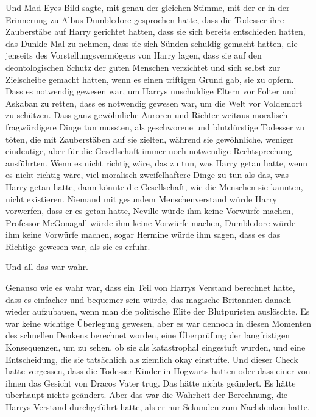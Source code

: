 Und Mad-Eyes Bild sagte, mit genau der gleichen Stimme, mit der er in der Erinnerung zu Albus Dumbledore gesprochen hatte, dass die Todesser ihre Zauberstäbe auf Harry gerichtet hatten, dass sie sich bereits entschieden hatten, das Dunkle Mal zu nehmen, dass sie sich Sünden schuldig gemacht hatten, die jenseits des Vorstellungsvermögens von Harry lagen, dass sie auf den deontologischen Schutz der guten Menschen verzichtet und sich selbst zur Zielscheibe gemacht hatten, wenn es einen triftigen Grund gab, sie zu opfern. Dass es notwendig gewesen war, um Harrys unschuldige Eltern vor Folter und Askaban zu retten, dass es notwendig gewesen war, um die Welt vor Voldemort zu schützen. Dass ganz gewöhnliche Auroren und Richter weitaus moralisch fragwürdigere Dinge tun mussten, als geschworene und blutdürstige Todesser zu töten, die mit Zauberstäben auf sie zielten, während sie gewöhnliche, weniger eindeutige, aber für die Gesellschaft immer noch notwendige Rechtsprechung ausführten. Wenn es nicht richtig wäre, das zu tun, was Harry getan hatte, wenn es nicht richtig wäre, viel moralisch zweifelhaftere Dinge zu tun als das, was Harry getan hatte, dann könnte die Gesellschaft, wie die Menschen sie kannten, nicht existieren. Niemand mit gesundem Menschenverstand würde Harry vorwerfen, dass er es getan hatte, Neville würde ihm keine Vorwürfe machen, Professor McGonagall würde ihm keine Vorwürfe machen, Dumbledore würde ihm keine Vorwürfe machen, sogar Hermine würde ihm sagen, dass es das Richtige gewesen war, als sie es erfuhr.

Und all das war wahr.

Genauso wie es wahr war, dass ein Teil von Harrys Verstand berechnet hatte, dass es einfacher und bequemer sein würde, das magische Britannien danach wieder aufzubauen, wenn man die politische Elite der Blutpuristen auslöschte. Es war keine wichtige Überlegung gewesen, aber es war dennoch in diesen Momenten des schnellen Denkens berechnet worden, eine Überprüfung der langfristigen Konsequenzen, um zu sehen, ob sie als katastrophal eingestuft wurden, und eine Entscheidung, die sie tatsächlich als ziemlich okay einstufte. Und dieser Check hatte vergessen, dass die Todesser Kinder in Hogwarts hatten oder dass einer von ihnen das Gesicht von Dracos Vater trug.
Das hätte nichts geändert. Es hätte überhaupt nichts geändert. Aber das war die Wahrheit der Berechnung, die Harrys Verstand durchgeführt hatte, als er nur Sekunden zum Nachdenken hatte.

